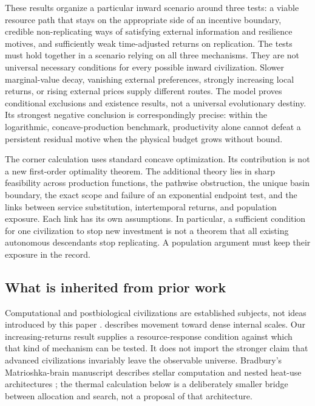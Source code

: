 \documentclass[11pt,a4paper]{article}
\theoremstyle{definition}\newtheorem{definition}{Definition}
\begin{document}
These results organize a particular inward scenario around three tests:
a viable resource path that stays on the appropriate side of an incentive
boundary, credible non-replicating ways of satisfying external information
and resilience motives, and sufficiently weak time-adjusted returns on
replication. The tests must hold together in a scenario relying on all
three mechanisms. They are not universal necessary conditions for every
possible inward civilization. Slower marginal-value decay, vanishing
external preferences, strongly increasing local returns, or rising external
prices supply different routes. The model proves conditional exclusions
and existence results, not a universal evolutionary destiny. Its strongest
negative conclusion is correspondingly precise: within the logarithmic,
concave-production benchmark, productivity alone cannot defeat a persistent
residual motive when the physical budget grows without bound.

The corner calculation uses standard concave optimization. Its contribution
is not a new first-order optimality theorem. The additional theory lies in
sharp feasibility across production functions, the pathwise obstruction,
the unique basin boundary, the exact scope and failure of an exponential
endpoint test, and the links between service substitution, intertemporal
returns, and population exposure. Each link has its own assumptions. In
particular, a sufficient condition for one civilization to stop new
investment is not a theorem that all existing autonomous descendants stop
replicating. A population argument must keep their exposure in the record.

\subsection{What is inherited from prior work}
Computational and postbiological civilizations are established subjects,
not ideas introduced by this paper \citep{Dick2003,CirkovicBradbury2006}.
\citet{Smart2012} describes movement toward dense internal scales. Our
increasing-returns result supplies a resource-response condition against
which that kind of mechanism can be tested. It does not import the stronger
claim that advanced civilizations invariably leave the observable universe.
Bradbury's Matrioshka-brain manuscript describes stellar computation and
nested heat-use architectures \citep{Bradbury1999}; the thermal calculation
below is a deliberately smaller bridge between allocation and search,
not a proposal of that architecture.
\end{document}
